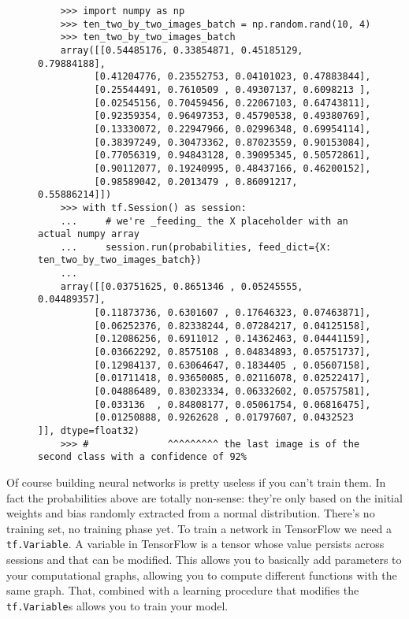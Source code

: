 \begin{figure}
  \begin{verbatim}
    >>> import numpy as np
    >>> ten_two_by_two_images_batch = np.random.rand(10, 4)
    >>> ten_two_by_two_images_batch
    array([[0.54485176, 0.33854871, 0.45185129, 0.79884188],
          [0.41204776, 0.23552753, 0.04101023, 0.47883844],
          [0.25544491, 0.7610509 , 0.49307137, 0.6098213 ],
          [0.02545156, 0.70459456, 0.22067103, 0.64743811],
          [0.92359354, 0.96497353, 0.45790538, 0.49380769],
          [0.13330072, 0.22947966, 0.02996348, 0.69954114],
          [0.38397249, 0.30473362, 0.87023559, 0.90153084],
          [0.77056319, 0.94843128, 0.39095345, 0.50572861],
          [0.90112077, 0.19240995, 0.48437166, 0.46200152],
          [0.98589042, 0.2013479 , 0.86091217, 0.55886214]])
    >>> with tf.Session() as session:
    ...     # we're _feeding_ the X placeholder with an actual numpy array
    ...     session.run(probabilities, feed_dict={X: ten_two_by_two_images_batch})
    ...
    array([[0.03751625, 0.8651346 , 0.05245555, 0.04489357],
          [0.11873736, 0.6301607 , 0.17646323, 0.07463871],
          [0.06252376, 0.82338244, 0.07284217, 0.04125158],
          [0.12086256, 0.6911012 , 0.14362463, 0.04441159],
          [0.03662292, 0.8575108 , 0.04834893, 0.05751737],
          [0.12984137, 0.63064647, 0.1834405 , 0.05607158],
          [0.01711418, 0.93650085, 0.02116078, 0.02522417],
          [0.04886489, 0.83023334, 0.06332602, 0.05757581],
          [0.033136  , 0.84808177, 0.05061754, 0.06816475],
          [0.01250888, 0.9262628 , 0.01797607, 0.0432523 ]], dtype=float32)
    >>> #              ^^^^^^^^^ the last image is of the second class with a confidence of 92%
  \end{verbatim}
  \caption{}
\end{figure}

Of course building neural networks is pretty useless if you can't train
them. In fact the probabilities above are totally non-sense: they're
only based on the initial weights and bias randomly extracted from a
normal distribution. There's no training set, no training phase yet. To
train a network in TensorFlow we need a \texttt{tf.Variable}. A
variable in TensorFlow is a tensor whose value persists across sessions
and that can be modified. This allows you to basically add parameters
to your computational graphs, allowing you to compute different
functions with the same graph. That, combined with a learning procedure
that modifies the \texttt{tf.Variable}s allows you to train your model.

